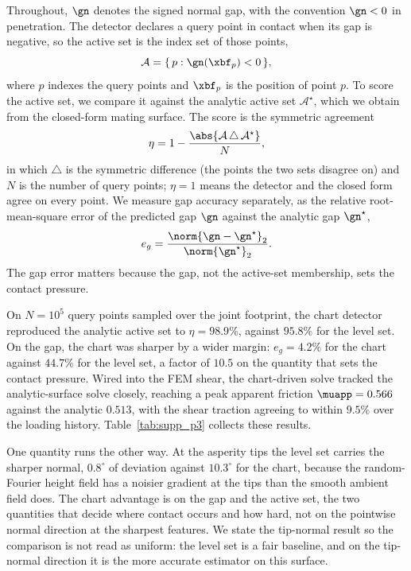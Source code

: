 Throughout, $\gn$ denotes the signed normal gap, with the convention $\gn<0$ in penetration. The detector
declares a query point in contact when its gap is negative, so the active set is the index set of those
points,
%
\begin{equation}\label{eq:supp_activeset}
\mathcal{A}=\{\,p : \gn(\xbf_p)<0\,\},
\end{equation}
%
where $p$ indexes the query points and $\xbf_p$ is the position of point $p$. To score the active set, we
compare it against the analytic active set $\mathcal{A}^{\star}$, which we obtain from the closed-form
mating surface. The score is the symmetric agreement
%
\begin{equation}\label{eq:supp_agreement}
\eta=1-\frac{\abs{\mathcal{A}\,\triangle\,\mathcal{A}^{\star}}}{N},
\end{equation}
%
in which $\triangle$ is the symmetric difference (the points the two sets disagree on) and $N$ is the
number of query points; $\eta=1$ means the detector and the closed form agree on every point. We measure
gap accuracy separately, as the relative root-mean-square error of the predicted gap $\gn$ against the
analytic gap $\gn^{\star}$,
%
\begin{equation}\label{eq:supp_gaprmse}
e_g=\frac{\norm{\gn-\gn^{\star}}_{2}}{\norm{\gn^{\star}}_{2}}.
\end{equation}
%
The gap error matters because the gap, not the active-set membership, sets the contact pressure.

On $N=10^{5}$ query points sampled over the joint footprint, the chart detector reproduced the analytic
active set to $\eta=98.9\%$, against $95.8\%$ for the level set. On the gap, the chart was sharper by a
wider margin: $e_g=4.2\%$ for the chart against $44.7\%$ for the level set, a factor of $10.5$ on the
quantity that sets the contact pressure. Wired into the FEM shear, the chart-driven solve tracked the
analytic-surface solve closely, reaching a peak apparent friction $\muapp=0.566$ against the analytic
$0.513$, with the shear traction agreeing to within $9.5\%$ over the loading history. Table~\ref{tab:supp_p3}
collects these results.

One quantity runs the other way. At the asperity tips the level set carries the sharper
normal, $0.8^{\circ}$ of deviation against $10.3^{\circ}$ for the chart, because the random-Fourier height
field has a noisier gradient at the tips than the smooth ambient field does. The chart advantage is on the
gap and the active set, the two quantities that decide where contact occurs and how hard, not on the
pointwise normal direction at the sharpest features. We state the tip-normal result so the comparison is
not read as uniform: the level set is a fair baseline, and on the tip-normal direction it is the more
accurate estimator on this surface.

